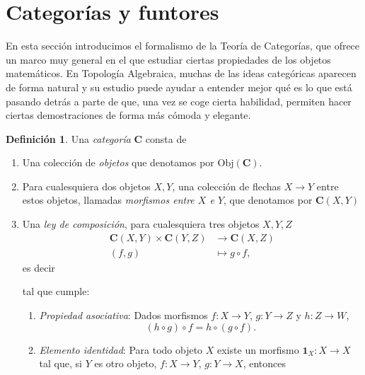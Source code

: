 \documentclass[12pt,a4paper]{book}
\theoremstyle{definition} \newtheorem{defn}[thm]{Definición}
\theoremstyle{definition} \newtheorem{ejemplo}[thm]{Ejemplo}
\theoremstyle{definition} \newtheorem{ejercicio}[thm]{Ejercicio}
\theoremstyle{remark} \newtheorem*{obs}{Observación}
\def\id{\mathbf{1}}
\def\obj{\mathrm{Obj}}
\def\cat{\mathbf{C}}
\begin{document}
\section{Categorías y funtores}
En esta sección introducimos el formalismo de la Teoría de Categorías, que ofrece un marco muy general en el que estudiar ciertas propiedades de los objetos matemáticos. En Topología Algebraica, muchas de las ideas categóricas aparecen de forma natural y su estudio puede ayudar a entender mejor qué es lo que está pasando detrás a parte de que, una vez se coge cierta habilidad, permiten hacer ciertas demostraciones de forma más cómoda y elegante.

\begin{defn}
  Una \emph{categoría} $\cat$ consta de
  \begin{enumerate}
    \item Una colección de \emph{objetos} que denotamos por $\obj(\cat)$.
    \item Para cualesquiera dos objetos $X,Y$, una colección de flechas $X\rightarrow Y$ entre estos objetos, llamadas \emph{morfismos entre $X$ e $Y$}, que denotamos por $\cat(X,Y)$
    \item Una \emph{ley de composición}, para cualesquiera tres objetos $X,Y,Z$
      \begin{align*}
	\cat(X,Y)\times \cat(Y,Z)&\longrightarrow \cat(X,Z)\\ 
	  (f,g) &\longmapsto g\circ f, 
	\end{align*}
es decir
\begin{center}
 \end{center}
 tal que cumple:
 \begin{enumerate}
   \item \textit{Propiedad asociativa}: Dados morfismos $f:X\rightarrow Y$, $g:Y\rightarrow Z$ y $h:Z\rightarrow W$,
     \begin{equation*}
       (h\circ g)\circ f = h\circ(g\circ f).
     \end{equation*}
   \item \textit{Elemento identidad}: Para todo objeto $X$ existe un morfismo $\id_X:X\rightarrow X$ tal que, si $Y$ es otro objeto, $f:X\rightarrow Y$, $g:Y\rightarrow X$, entonces
     \begin{equation*}

\end{equation*}
\end{enumerate}
\end{enumerate}
\end{defn}
\end{document}
